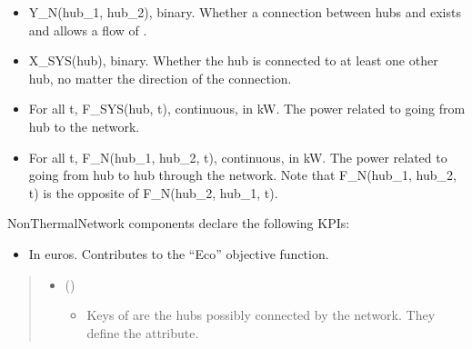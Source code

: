 \documentclass[letterpaper,10pt,english]{sphinxmanual}
\begin{document}
\begin{fulllineitems}
\begin{fulllineitems}
\begin{itemize}
\item {} 
\sphinxAtStartPar
Y\_N(hub\_1, hub\_2), binary.
Whether a connection between hubs  and  exists and allows a flow of .

\item {} 
\sphinxAtStartPar
X\_SYS(hub), binary.
Whether the hub  is connected to at least one other hub, no matter the direction of the connection.

\item {} 
\sphinxAtStartPar
For all t, F\_SYS(hub, t), continuous, in kW.
The power related to  going from hub  to the network.

\item {} 
\sphinxAtStartPar
For all t, F\_N(hub\_1, hub\_2, t), continuous, in kW.
The power related to  going from hub  to hub  through the network.
Note that F\_N(hub\_1, hub\_2, t) is the opposite of F\_N(hub\_2, hub\_1, t).

\end{itemize}

\sphinxAtStartPar
NonThermalNetwork components declare the following KPIs:
\begin{itemize}
\item {} 
\sphinxAtStartPar
{}
In euros.
Contributes to the “Eco” objective function.

\end{itemize}
\begin{quote}\begin{description}
\begin{itemize}
\item {} 
\sphinxAtStartPar
{} (\sphinxstyleliteralemphasis{\sphinxupquote{ (}}\sphinxstyleliteralemphasis{\sphinxupquote{, }}\sphinxstyleliteralemphasis{\sphinxupquote{)}}\sphinxstyleliteralemphasis{\sphinxupquote{\}}}) \textendash{} \begin{itemize}
\item {} 
\sphinxAtStartPar
Keys of  are the hubs possibly connected by the network.
They define the  attribute.


\end{itemize}
\end{itemize}
\end{description}
\end{quote}
\end{fulllineitems}
\end{fulllineitems}
\end{document}
